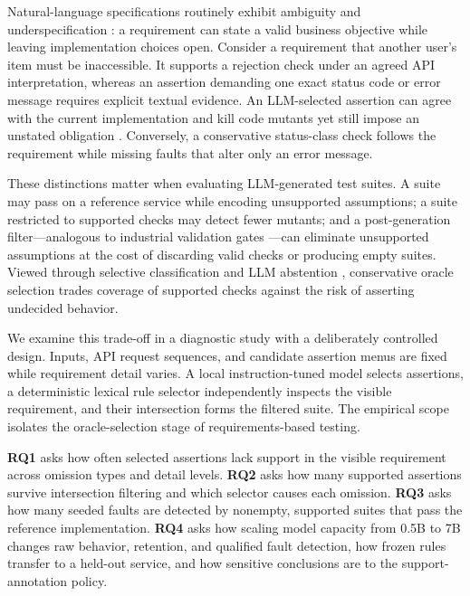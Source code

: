 \documentclass[sigconf,nonacm]{acmart}
\begin{document}
Natural-language specifications routinely exhibit ambiguity and underspecification \cite{berry2004,ezzini2022}: a requirement can state a valid business objective while leaving implementation choices open. Consider a requirement that another user's item must be inaccessible. It supports a rejection check under an agreed API interpretation, whereas an assertion demanding one exact status code or error message requires explicit textual evidence. An LLM-selected assertion can agree with the current implementation and kill code mutants yet still impose an unstated obligation \cite{konstantinou2024,ding2026}. Conversely, a conservative status-class check follows the requirement while missing faults that alter only an error message.

These distinctions matter when evaluating LLM-generated test suites. A suite may pass on a reference service while encoding unsupported assumptions; a suite restricted to supported checks may detect fewer mutants; and a post-generation filter---analogous to industrial validation gates \cite{harman2025ach}---can eliminate unsupported assumptions at the cost of discarding valid checks or producing empty suites. Viewed through selective classification \cite{elyaniv2010} and LLM abstention \cite{wen2025}, conservative oracle selection trades coverage of supported checks against the risk of asserting undecided behavior.

We examine this trade-off in a diagnostic study with a deliberately controlled design. Inputs, API request sequences, and candidate assertion menus are fixed while requirement detail varies. A local instruction-tuned model selects assertions, a deterministic lexical rule selector independently inspects the visible requirement, and their intersection forms the filtered suite. The empirical scope isolates the oracle-selection stage of requirements-based testing.

\textbf{RQ1} asks how often selected assertions lack support in the visible requirement across omission types and detail levels. \textbf{RQ2} asks how many supported assertions survive intersection filtering and which selector causes each omission. \textbf{RQ3} asks how many seeded faults are detected by nonempty, supported suites that pass the reference implementation. \textbf{RQ4} asks how scaling model capacity from 0.5B to 7B changes raw behavior, retention, and qualified fault detection, how frozen rules transfer to a held-out service, and how sensitive conclusions are to the support-annotation policy.
\end{document}
